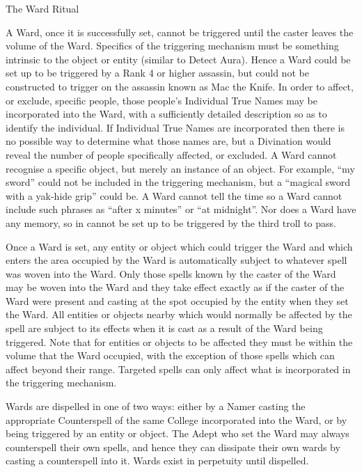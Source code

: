 \begin{multicols}{3}
\begin{ritual}[]{The Ward Ritual}
\begin{effects}
A Ward, once it is successfully set, cannot be triggered until the
caster leaves the volume of the Ward.  Specifics of the triggering
mechanism must be something intrinsic to the object or entity (similar
to Detect Aura). Hence a Ward could be set up to be triggered by a
Rank 4 or higher assassin, but could not be constructed to trigger on
the assassin known as Mac the Knife. In order to affect, or exclude,
specific people, those people's Individual True Names may be
incorporated into the Ward, with a sufficiently detailed description
so as to identify the individual. If Individual True Names are
incorporated then there is no possible way to determine what those
names are, but a Divination would reveal the number of people
specifically affected, or excluded.  A Ward cannot recognise a
specific object, but merely an instance of an object.  For example,
``my sword'' could not be included in the triggering mechanism, but a
``magical sword with a yak-hide grip'' could be.  A Ward cannot tell
the time so a Ward cannot include such phrases as ``after x minutes''
or ``at midnight''.  Nor does a Ward have any memory, so in cannot be
set up to be triggered by the third troll to pass.

Once a Ward is set, any entity or object which could trigger the Ward
and which enters the area occupied by the Ward is automatically
subject to whatever spell was woven into the Ward.  Only those spells
known by the caster of the Ward may be woven into the Ward and they
take effect exactly as if the caster of the Ward were present and
casting at the spot occupied by the entity when they set the Ward.
All entities or objects nearby which would normally be affected by the
spell are subject to its effects when it is cast as a result of the
Ward being triggered. Note that for entities or objects to be affected
they must be within the volume that the Ward occupied, with the
exception of those spells which can affect beyond their range.
Targeted spells can only affect what is incorporated in the triggering
mechanism.

Wards are dispelled in one of two ways: either by a Namer casting the
appropriate Counterspell of the same College incorporated into the
Ward, or by being triggered by an entity or object. The Adept who set
the Ward may always counterspell their own spells, and hence they can
dissipate their own wards by casting a counterspell into it.  Wards
exist in perpetuity until dispelled.
\end{effects}
\end{ritual}


\end{multicols}
